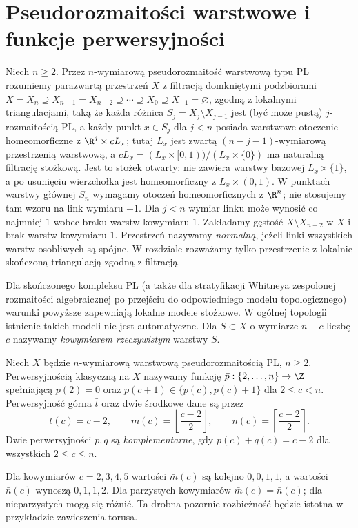 \section{Pseudorozmaitości warstwowe i funkcje perwersyjności}
\begin{definicja}
\label{def:pseudomanifold-xiii}
Niech $n\ge2$. Przez $n$-wymiarową pseudorozmaitość
warstwową typu PL rozumiemy parazwartą przestrzeń $X$
z filtracją domkniętymi podzbiorami
$X=X_n\supseteq X_{n-1}=X_{n-2}\supseteq\cdots\supseteq X_0
\supseteq X_{-1}=\varnothing$, zgodną z lokalnymi
triangulacjami, taką że każda różnica
$S_j=X_j\setminus X_{j-1}$ jest (być może pustą)
$j$-rozmaitością PL, a każdy punkt $x\in S_j$ dla $j<n$ posiada
warstwowe otoczenie homeomorficzne z
$\R^j\times cL_x$; tutaj $L_x$ jest zwartą
$(n-j-1)$-wymiarową przestrzenią warstwową,
a $cL_x=(L_x\times[0,1))/(L_x\times\{0\})$
ma naturalną filtrację stożkową. Jest to stożek otwarty:
nie zawiera warstwy bazowej $L_x\times\{1\}$, a po
usunięciu wierzchołka jest homeomorficzny z
$L_x\times(0,1)$. W punktach warstwy
głównej $S_n$ wymagamy otoczeń homeomorficznych
z $\R^n$; nie stosujemy tam wzoru na link
wymiaru $-1$. Dla $j<n$ wymiar linku może wynosić
co najmniej $1$ wobec braku warstw kowymiaru $1$. Zakładamy gęstość
$X\setminus X_{n-2}$ w $X$ i brak warstw kowymiaru $1$.
Przestrzeń nazywamy \emph{normalną}, jeżeli linki
wszystkich warstw osobliwych są spójne. W rozdziale
rozważamy tylko przestrzenie z lokalnie skończoną
triangulacją zgodną z filtracją.
\end{definicja}
\begin{uwaga}
Dla skończonego kompleksu PL (a także dla stratyfikacji
Whitneya zespolonej rozmaitości algebraicznej po przejściu
do odpowiedniego modelu topologicznego) warunki powyższe
zapewniają lokalne modele stożkowe. W ogólnej topologii
istnienie takich modeli nie jest automatyczne.
Dla $S\subset X$ o wymiarze $n-c$ liczbę $c$ nazywamy
\emph{kowymiarem rzeczywistym} warstwy $S$.
\end{uwaga}

\begin{definicja}
\label{def:perversity-xiii}
Niech $X$ będzie $n$-wymiarową warstwową
pseudorozmaitością PL, $n\ge2$. Perwersyjnością
klasyczną na $X$ nazywamy funkcję
$\bar p:\{2,\ldots,n\}\to\Z$ spełniającą
$\bar p(2)=0$ oraz
$\bar p(c+1)\in\{\bar p(c),\bar p(c)+1\}$
dla $2\le c<n$. Perwersyjność górna $\bar t$
oraz dwie środkowe dane są przez
\[
\bar t(c)=c-2,\qquad
\bar m(c)=\left\lfloor\frac{c-2}{2}\right\rfloor,
\qquad
\bar n(c)=\left\lceil\frac{c-2}{2}\right\rceil.
\]
Dwie perwersyjności $\bar p,\bar q$ są
\emph{komplementarne}, gdy $\bar p(c)+\bar q(c)=c-2$
dla wszystkich $2\le c\le n$.
\end{definicja}
\begin{przyklad}
Dla kowymiarów $c=2,3,4,5$ wartości $\bar m(c)$
są kolejno $0,0,1,1$, a wartości $\bar n(c)$
wynoszą $0,1,1,2$. Dla parzystych kowymiarów
$\bar m(c)=\bar n(c)$; dla nieparzystych mogą się
różnić. Ta drobna pozornie rozbieżność będzie istotna
w przykładzie zawieszenia torusa.
\end{przyklad}

